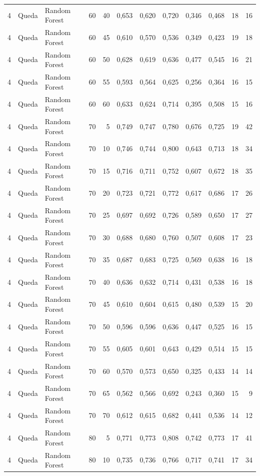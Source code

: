 \begin{longtable}{@{}rllrrrrrrrrr@{}}
4 & Queda & Random Forest & 60 & 40 & 0,653 & 0,620 & 0,720 & 0,346 & 0,468 & 18 & 16 \\
4 & Queda & Random Forest & 60 & 45 & 0,610 & 0,570 & 0,536 & 0,349 & 0,423 & 19 & 18 \\
4 & Queda & Random Forest & 60 & 50 & 0,628 & 0,619 & 0,636 & 0,477 & 0,545 & 16 & 21 \\
4 & Queda & Random Forest & 60 & 55 & 0,593 & 0,564 & 0,625 & 0,256 & 0,364 & 16 & 15 \\
4 & Queda & Random Forest & 60 & 60 & 0,633 & 0,624 & 0,714 & 0,395 & 0,508 & 15 & 16 \\
4 & Queda & Random Forest & 70 & 5 & 0,749 & 0,747 & 0,780 & 0,676 & 0,725 & 19 & 42 \\
4 & Queda & Random Forest & 70 & 10 & 0,746 & 0,744 & 0,800 & 0,643 & 0,713 & 18 & 34 \\
4 & Queda & Random Forest & 70 & 15 & 0,716 & 0,711 & 0,752 & 0,607 & 0,672 & 18 & 35 \\
4 & Queda & Random Forest & 70 & 20 & 0,723 & 0,721 & 0,772 & 0,617 & 0,686 & 17 & 26 \\
4 & Queda & Random Forest & 70 & 25 & 0,697 & 0,692 & 0,726 & 0,589 & 0,650 & 17 & 27 \\
4 & Queda & Random Forest & 70 & 30 & 0,688 & 0,680 & 0,760 & 0,507 & 0,608 & 17 & 23 \\
4 & Queda & Random Forest & 70 & 35 & 0,687 & 0,683 & 0,725 & 0,569 & 0,638 & 16 & 18 \\
4 & Queda & Random Forest & 70 & 40 & 0,636 & 0,632 & 0,714 & 0,431 & 0,538 & 16 & 18 \\
4 & Queda & Random Forest & 70 & 45 & 0,610 & 0,604 & 0,615 & 0,480 & 0,539 & 15 & 20 \\
4 & Queda & Random Forest & 70 & 50 & 0,596 & 0,596 & 0,636 & 0,447 & 0,525 & 16 & 15 \\
4 & Queda & Random Forest & 70 & 55 & 0,605 & 0,601 & 0,643 & 0,429 & 0,514 & 15 & 15 \\
4 & Queda & Random Forest & 70 & 60 & 0,570 & 0,573 & 0,650 & 0,325 & 0,433 & 14 & 14 \\
4 & Queda & Random Forest & 70 & 65 & 0,562 & 0,566 & 0,692 & 0,243 & 0,360 & 15 & 9 \\
4 & Queda & Random Forest & 70 & 70 & 0,612 & 0,615 & 0,682 & 0,441 & 0,536 & 14 & 12 \\
4 & Queda & Random Forest & 80 & 5 & 0,771 & 0,773 & 0,808 & 0,742 & 0,773 & 17 & 41 \\
4 & Queda & Random Forest & 80 & 10 & 0,735 & 0,736 & 0,766 & 0,717 & 0,741 & 17 & 34 \\

\end{longtable}
